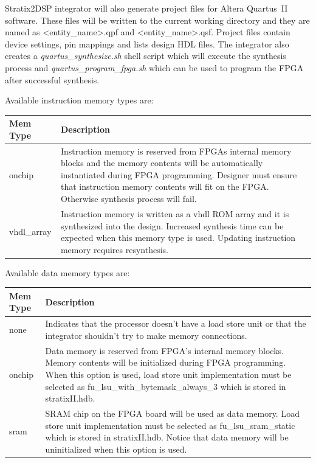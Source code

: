 \documentclass[a4paper,twoside]{tceusermanual}
\begin{document}
Stratix2DSP integrator will also generate project files for Altera Quartus~II
software. These files will be written to the current working directory and they
are named as <entity\_name>.qpf and <entity\_name>.qsf. Project files contain
device settings, pin mappings and lists design HDL files. The integrator also
creates a \textit{quartus\_synthesize.sh} shell script which will execute the synthesis
process and \textit{quartus\_program\_fpga.sh} which can be used to program the FPGA
after successful synthesis.

Available instruction memory types are:
\begin{center}
\begin{longtable}[htb]{@{}p{}%
                     @{}p{}}

\textbf{Mem Type} &\textbf{Description} \\
\hline
onchip & Instruction memory is reserved from FPGAs internal memory blocks and
the memory contents will be automatically instantiated during FPGA programming.
Designer must ensure that instruction memory contents will fit on the FPGA.
Otherwise synthesis process will fail. \\
vhdl\_array & Instruction memory is written as a vhdl ROM array and it is
synthesized into the design. Increased synthesis time can be expected when this
memory type is used. Updating instruction memory requires resynthesis.
\end{longtable}
\end{center}

Available data memory types are:
\begin{center}
\begin{longtable}[htb]{@{}p{}%
                     @{}p{}}

\textbf{Mem Type} &\textbf{Description} \\
\hline
none & Indicates that the processor doesn't have a load store unit or that the
integrator shouldn't try to make memory connections. \\

onchip & Data memory is reserved from FPGA's internal memory blocks. Memory
contents will be initialized during FPGA programming. When this option is used,
load store unit implementation must be selected as
fu\_lsu\_with\_bytemask\_always\_3 which is stored in stratixII.hdb.\\

sram & SRAM chip on the FPGA board will be used as data memory. Load store unit
implementation must be selected as fu\_lsu\_sram\_static which is stored in
stratixII.hdb. Notice that data memory will be uninitialized when this option
is used.
\end{longtable}
\end{center}
\end{document}
